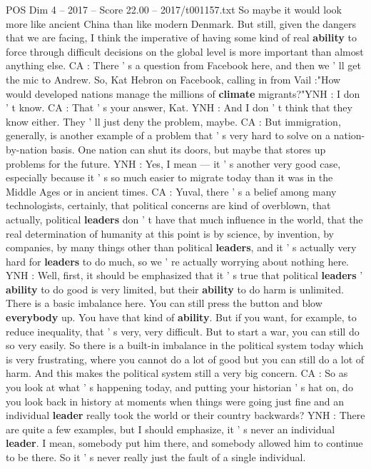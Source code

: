 \begin{textsample}{POS Dim 4 – 2017 – Score 22.00 – 2017/t001157.txt}
So maybe it would look more like ancient China than like modern Denmark.
But still, given the dangers that we are facing, I think the imperative of having some kind of real \textbf{ability} to force through difficult decisions on the global level is more important than almost anything else.
CA : There ' s a question from Facebook here, and then we ' ll get the mic to Andrew.
So, Kat Hebron on Facebook, calling in from Vail :"How would developed nations manage the millions of \textbf{climate} migrants?"YNH : I don ' t know.
CA : That ' s your answer, Kat.
YNH : And I don ' t think that they know either.
They ' ll just deny the problem, maybe.
CA : But immigration, generally, is another example of a problem that ' s very hard to solve on a nation-by-nation basis.
One nation can shut its doors, but maybe that stores up problems for the future.
YNH : Yes, I mean — it ' s another very good case, especially because it ' s so much easier to migrate today than it was in the Middle Ages or in ancient times.
CA : Yuval, there ' s a belief among many technologists, certainly, that political concerns are kind of overblown, that actually, political \textbf{leaders} don ' t have that much influence in the world, that the real determination of humanity at this point is by science, by invention, by companies, by many things other than political \textbf{leaders}, and it ' s actually very hard for \textbf{leaders} to do much, so we ' re actually worrying about nothing here.
YNH : Well, first, it should be emphasized that it ' s true that political \textbf{leaders} ' \textbf{ability} to do good is very limited, but their \textbf{ability} to do harm is unlimited.
There is a basic imbalance here.
You can still press the button and blow \textbf{everybody} up.
You have that kind of \textbf{ability}.
But if you want, for example, to reduce inequality, that ' s very, very difficult.
But to start a war, you can still do so very easily.
So there is a built-in imbalance in the political system today which is very frustrating, where you cannot do a lot of good but you can still do a lot of harm.
And this makes the political system still a very big concern.
CA : So as you look at what ' s happening today, and putting your historian ' s hat on, do you look back in history at moments when things were going just fine and an individual \textbf{leader} really took the world or their country backwards?
YNH : There are quite a few examples, but I should emphasize, it ' s never an individual \textbf{leader}.
I mean, somebody put him there, and somebody allowed him to continue to be there.
So it ' s never really just the fault of a single individual.

\end{textsample}
